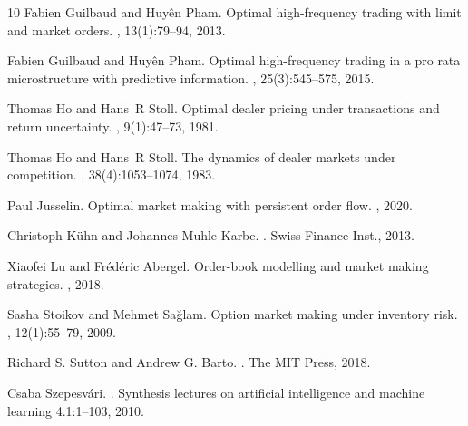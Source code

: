 \documentclass[preprint, 3p]{elsarticle}
\newcommand{\1}{{\chi}}
\begin{document}
\begin{thebibliography}{10}
Fabien Guilbaud and Huy\^en Pham.
\newblock Optimal high-frequency trading with limit and market orders.
, 13(1):79--94, 2013.

Fabien Guilbaud and Huy{\^e}n Pham.
\newblock Optimal high-frequency trading in a pro rata microstructure with
  predictive information.
, 25(3):545--575, 2015.

Thomas Ho and Hans~R Stoll.
\newblock Optimal dealer pricing under transactions and return uncertainty.
, 9(1):47--73, 1981.

Thomas Ho and Hans~R Stoll.
\newblock The dynamics of dealer markets under competition.
, 38(4):1053--1074, 1983.

Paul Jusselin.
\newblock Optimal market making with persistent order flow.
, 2020.

Christoph K{\"u}hn and Johannes Muhle-Karbe.
.
\newblock Swiss Finance Inst., 2013.

Xiaofei Lu and Fr{\'e}d{\'e}ric Abergel.
\newblock Order-book modelling and market making strategies.
, 2018.

Sasha Stoikov and Mehmet Sa{\u{g}}lam.
\newblock Option market making under inventory risk.
, 12(1):55--79, 2009.

Richard S. Sutton and  Andrew G. Barto.
.
\newblock The MIT Press, 2018.

Csaba Szepesv\'ari.
.
\newblock Synthesis lectures on artificial intelligence and machine learning 4.1:1--103, 2010.


\end{thebibliography}
\end{document}
